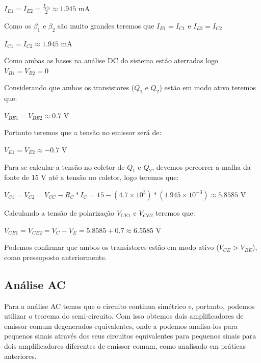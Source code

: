 \begin{center}
    $I_{E1}= I_{E2} = \frac{I_{C3}}{2} \approx 1.945$ mA
\end{center}

Como os $\beta_1$ e $\beta_2$ são muito grandes teremos que $I_{E1} = I_{C1}$ e $I_{E2} = I_{C2}$

\begin{center}
    $I_{C1}= I_{C2} \approx 1.945$ mA
\end{center}

Como ambas as bases na análise DC do sistema estão aterradas logo $V_{B1} = V_{B2} = 0$

Considerando que ambos os transistores ($Q_1$ e $Q_2$) estão em modo ativo teremos que:

\begin{center}
    $V_{BE1} = V_{BE2} \approx 0.7$ V
\end{center}

Portanto teremos que a tensão no emissor será de:

\begin{center}
    $V_{E1} = V_{E2} \approx -0.7$ V
\end{center}

Para se calcular a tensão no coletor de $Q_1$ e $Q_2$, devemos percorrer a malha da fonte de 15 V até a tensão no coletor, logo teremos que:

\begin{center}
    $V_{C1} = V_{C2} = V_{CC} - R_{C}*I_C = 15 - (4.7 \times 10^{3})*(1.945 \times 10^{-3})  \approx 5.8585$ V
\end{center}


Calculando a tensão de polarização $V_{CE1}$ e $V_{CE2}$ teremos que:


\begin{center}
    $V_{CE1} = V_{CE2} = V_{C} - V_{E} = 5.8585 + 0.7  \approx 6.5585$ V
\end{center}

Podemos confirmar que ambos os transistores estão em modo ativo ($V_{CE} > V_{BE}$), como pressuposto anteriormente.


\subsection{Análise AC}

Para a análise AC temos que o circuito continua simétrico e, portanto, podemos utilizar o teorema do semi-circuito. Com isso obtemos dois amplificadores de emissor comum degenerados equivalentes, onde a podemos analisa-los para pequenos sinais através dos seus circuitos equivalentes para pequenos sinais para dois amplificadores diferentes de emissor comum, como analisado em práticas anteriores.

